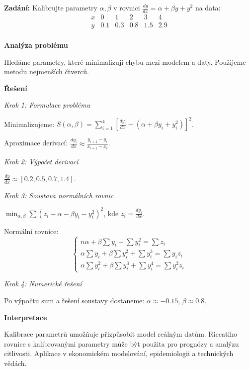 \vspace{2\baselineskip}

\begin{example}
\label{ex:d3-kalibrace}

\noindent\textbf{Zadání:} Kalibrujte parametry $\alpha, \beta$ v rovnici $\frac{dy}{dx} = \alpha + \beta y + y^2$ na data:
\[
\begin{array}{c|ccccc}
x & 0 & 1 & 2 & 3 & 4 \\
\hline
y & 0.1 & 0.3 & 0.8 & 1.5 & 2.9 \\
\end{array}
\]

\vspace{1.5\baselineskip}

\noindent\textbf{Analýza problému}

\noindent Hledáme parametry, které minimalizují chybu mezi modelem a daty. Použijeme metodu nejmenších čtverců.

\vspace{1.5\baselineskip}

\noindent\textbf{Řešení}

\noindent\textit{Krok 1: Formulace problému}

Minimalizujeme: $S(\alpha, \beta) = \sum_{i=1}^4 \left[\frac{dy_i}{dx} - (\alpha + \beta y_i + y_i^2)\right]^2$.

Aproximace derivací: $\frac{dy_i}{dx} \approx \frac{y_{i+1} - y_i}{x_{i+1} - x_i}$.

\noindent\textit{Krok 2: Výpočet derivací}

$\frac{dy}{dx} \approx [0.2, 0.5, 0.7, 1.4]$.

\noindent\textit{Krok 3: Soustava normálních rovnic}

$\min_{\alpha,\beta} \sum (z_i - \alpha - \beta y_i - y_i^2)^2$, kde $z_i = \frac{dy_i}{dx}$.

Normální rovnice:
\[
\begin{cases}
n\alpha + \beta\sum y_i + \sum y_i^2 = \sum z_i \\
\alpha\sum y_i + \beta\sum y_i^2 + \sum y_i^3 = \sum y_i z_i \\
\alpha\sum y_i^2 + \beta\sum y_i^3 + \sum y_i^4 = \sum y_i^2 z_i
\end{cases}
\]

\noindent\textit{Krok 4: Numerické řešení}

Po výpočtu sum a řešení soustavy dostaneme: $\alpha \approx -0.15$, $\beta \approx 0.8$.

\vspace{1.5\baselineskip}

\noindent\textbf{Interpretace}

Kalibrace parametrů umožňuje přizpůsobit model reálným datům. Riccatiho rovnice 
s kalibrovanými parametry může být použita pro prognózy a analýzu citlivosti. 
Aplikace v ekonomickém modelování, epidemiologii a technických vědách.

\end{example}

